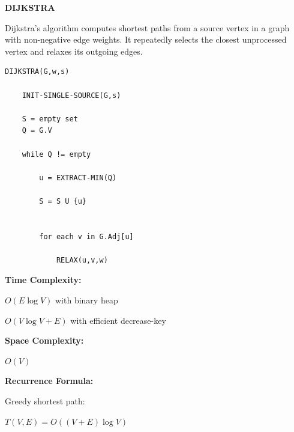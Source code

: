 \documentclass[a4paper,12pt]{article}
\begin{document}
\begin{tcolorbox}[
    colback=gray!30,
    colframe=black,
    boxrule=1pt,
    arc=0mm
]

\begin{tcolorbox}[
    colback=gray!10,
    colframe=black,
    arc=0mm
]
\centering
{\Huge\bfseries DIJKSTRA}
\end{tcolorbox}


\begin{tcolorbox}[
    colback=gray!10,
    colframe=black,
    arc=0mm
]
\small
Dijkstra's algorithm computes shortest paths from a source vertex in a graph
with non-negative edge weights. It repeatedly selects the closest unprocessed
vertex and relaxes its outgoing edges.
\end{tcolorbox}


\begin{tcolorbox}[
    colback=black!5,
    colframe=black,
    arc=0mm,
    title=Pseudo-code
]
\tiny
\begin{lstlisting}
DIJKSTRA(G,w,s)

    INIT-SINGLE-SOURCE(G,s)

    S = empty set
    Q = G.V

    while Q != empty

        u = EXTRACT-MIN(Q)

        S = S U {u}


        for each v in G.Adj[u]

            RELAX(u,v,w)
\end{lstlisting}
\end{tcolorbox}


\begin{tcolorbox}[
    colback=cyan!20,
    colframe=black,
    arc=0mm
]
\small
\textbf{Time Complexity:}

$O(E\log V)$ with binary heap

$O(V\log V + E)$ with efficient decrease-key
\end{tcolorbox}


\begin{tcolorbox}[
    colback=violet!20,
    colframe=black,
    arc=0mm
]
\small
\textbf{Space Complexity:}

$O(V)$
\end{tcolorbox}


\begin{tcolorbox}[
    colback=pink!20,
    colframe=black,
    arc=0mm
]
\small
\textbf{Recurrence Formula:}

Greedy shortest path:

$T(V,E)=O((V+E)\log V)$
\end{tcolorbox}

\end{tcolorbox}
\end{document}
